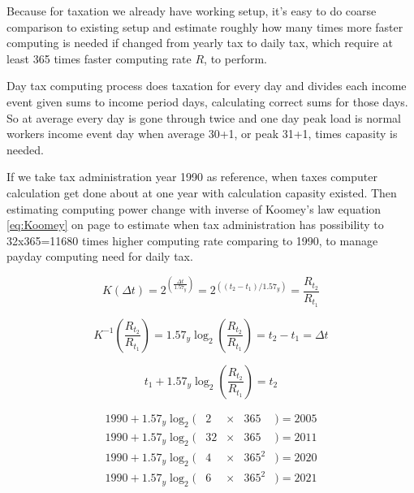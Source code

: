 Because for taxation we already have working setup, it's easy to do coarse
comparison to existing setup and estimate roughly how many times more faster
computing is needed if changed from yearly tax to daily tax, which require at
least 365 times faster computing rate $R$, to perform.

Day tax computing process does taxation for every day and divides each income
event given sums to income period days, calculating correct sums for those
days. So at average every day is gone through twice and one day peak load is
normal workers income event day when average 30+1, or peak 31+1, times
capasity is needed.

If we take tax administration year 1990\allowbreak\cite{VeroItDeployment} as
reference, when taxes computer calculation get done about at one year with
calculation capasity existed. Then estimating computing power change with
inverse of Koomey's law\allowbreak\cite{KoomeysLaw}\allowbreak\cite{
 DennardScaling}\allowbreak\cite{PerformanceDevelTop500} equation
\ref{eq:Koomey} on page \pageref{eq:Koomey} to estimate when tax
administration has possibility to 32x365=11680 times higher computing rate
comparing to 1990, to manage payday computing need for daily tax.

\begin{equation} \label{eq:Koomey}
	K(\Delta t) =
	2^{(\frac{\Delta t}{1.57_y})} =
	2^{((t_2-t_1)/1.57_y)} =
	\frac{R_{t_2}}{R_{t_1}}
\end{equation}

\begin{equation} \label{eq:InverseKoomey}
	K^{-1}\left(\frac{R_{t_2}}{R_{t_1}}\right) =
	1.57_y \log_2\left(\frac{R_{t_2}}{R_{t_1}}\right) =
	t_2 - t_1 =
	\Delta t
\end{equation}

\begin{equation} \label{eq:InverseKoomeyTime}
t_1 + 1.57_y \log_2\left(\frac{R_{t_2}}{R_{t_1}}\right) = t_2
\end{equation}

\begin{equation} \label{eq:InverseKoomeyTime20052021}
 \begin{array}{lrcll}
	 1990 + 1.57_y \log_2(& 2&\times&365  &) = 2005 \\
	 1990 + 1.57_y \log_2(&32&\times&365  &) = 2011 \\
	 1990 + 1.57_y \log_2(& 4&\times&365^2&) = 2020 \\
	 1990 + 1.57_y \log_2(& 6&\times&365^2&) = 2021
 \end{array}
\end{equation}

